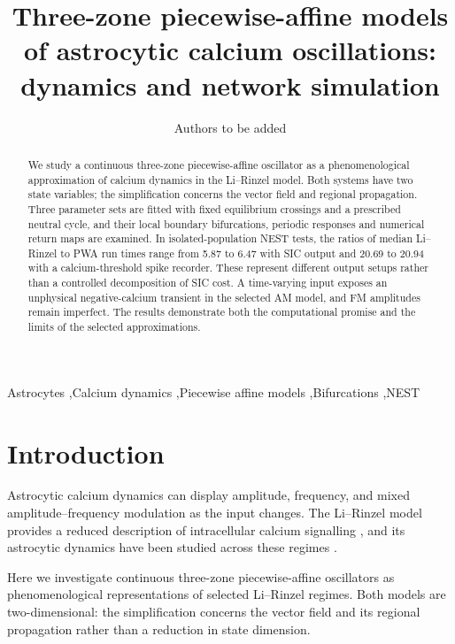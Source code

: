 \documentclass[final,5p,times,twocolumn]{elsarticle}
\begin{document}
\raggedbottom
\begin{frontmatter}

\title{Three-zone piecewise-affine models of astrocytic calcium oscillations: dynamics and network simulation}
\author{Authors to be added}

\begin{abstract}
We study a continuous three-zone piecewise-affine oscillator as a
phenomenological approximation of calcium dynamics in the Li--Rinzel model.
Both systems have two state variables; the simplification concerns the
vector field and regional propagation. Three parameter sets are fitted with
fixed equilibrium crossings and a prescribed neutral cycle, and their local
boundary bifurcations, periodic responses and numerical return maps are
examined. In isolated-population NEST tests, the ratios of median Li--Rinzel
to PWA run times range from 5.87 to 6.47 with SIC output and 20.69 to 20.94
with a calcium-threshold spike recorder. These represent different output
setups rather than a controlled decomposition of SIC cost. A time-varying
input exposes an unphysical negative-calcium transient in the selected AM
model, and FM amplitudes remain imperfect. The results demonstrate both the
computational promise and the limits of the selected approximations.
\end{abstract}

\begin{keyword}
Astrocytes \sep Calcium dynamics \sep Piecewise affine models \sep Bifurcations \sep NEST
\end{keyword}
\end{frontmatter}

\section{Introduction}
\label{sec:introduction}
Astrocytic calcium dynamics can display amplitude, frequency, and mixed
amplitude--frequency modulation as the input changes. The Li--Rinzel model
provides a reduced description of intracellular calcium signalling
\cite{LiRinzel1994}, and its astrocytic dynamics have been studied across these
regimes \cite{DePitta2009}.

Here we investigate continuous three-zone piecewise-affine oscillators as
phenomenological representations of selected Li--Rinzel regimes. Both models
are two-dimensional: the simplification concerns the vector field and its
regional propagation rather than a reduction in state dimension.
\end{document}
